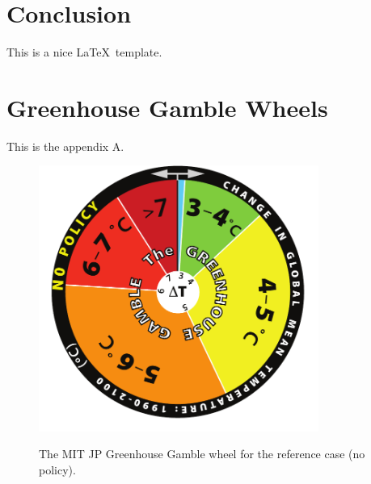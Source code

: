 \documentclass[12pt,fleqn]{article}
\begin{document}
\section{Conclusion}

This is a nice \LaTeX\, template.


\nocite{*}





\newpage
\appendix

\section{Greenhouse Gamble Wheels}

This is the appendix A.

\begin{figure}[h!]
  \centering
  \noindent\includegraphics[width=3.6in]{../figure/GHG_ReferenceWheel2009.pdf}\\
  \caption{The MIT JP Greenhouse Gamble wheel for the reference case (no policy).}\label{fig:jpwheelnopolicy}
\end{figure}
\end{document}
